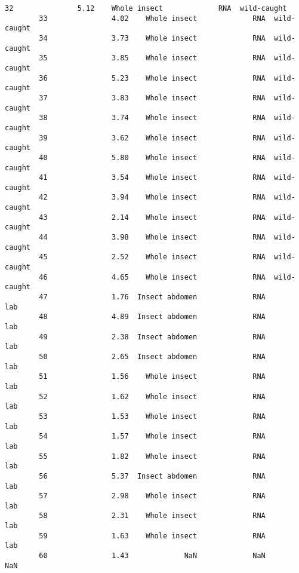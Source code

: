 \documentclass[11pt]{article}
\begin{document}
\begin{Verbatim}[commandchars=\\\{\}]
        32               5.12    Whole insect             RNA  wild-caught   
        33               4.02    Whole insect             RNA  wild-caught   
        34               3.73    Whole insect             RNA  wild-caught   
        35               3.85    Whole insect             RNA  wild-caught   
        36               5.23    Whole insect             RNA  wild-caught   
        37               3.83    Whole insect             RNA  wild-caught   
        38               3.74    Whole insect             RNA  wild-caught   
        39               3.62    Whole insect             RNA  wild-caught   
        40               5.80    Whole insect             RNA  wild-caught   
        41               3.54    Whole insect             RNA  wild-caught   
        42               3.94    Whole insect             RNA  wild-caught   
        43               2.14    Whole insect             RNA  wild-caught   
        44               3.98    Whole insect             RNA  wild-caught   
        45               2.52    Whole insect             RNA  wild-caught   
        46               4.65    Whole insect             RNA  wild-caught   
        47               1.76  Insect abdomen             RNA          lab   
        48               4.89  Insect abdomen             RNA          lab   
        49               2.38  Insect abdomen             RNA          lab   
        50               2.65  Insect abdomen             RNA          lab   
        51               1.56    Whole insect             RNA          lab   
        52               1.62    Whole insect             RNA          lab   
        53               1.53    Whole insect             RNA          lab   
        54               1.57    Whole insect             RNA          lab   
        55               1.82    Whole insect             RNA          lab   
        56               5.37  Insect abdomen             RNA          lab   
        57               2.98    Whole insect             RNA          lab   
        58               2.31    Whole insect             RNA          lab   
        59               1.63    Whole insect             RNA          lab   
        60               1.43             NaN             NaN          NaN   
        

\end{Verbatim}
\end{document}
